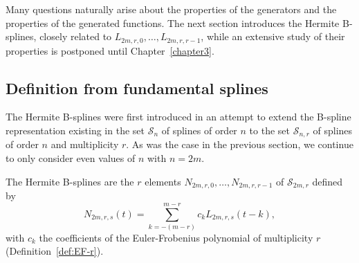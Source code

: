 Many questions naturally arise about the properties of the generators and the properties of the generated functions. The 
next section introduces the Hermite B-splines, closely related to $L_{2m,r,0}, \ldots, L_{2m, r, r-1}$, while an 
extensive study of their properties is postponed until Chapter~\ref{chapter3}.

\subsection{Definition from fundamental splines}

The Hermite B-splines were first introduced in an attempt to extend the B-spline representation existing in the set 
$\mathscr{S}_n$ of splines of order $n$ to the set $\mathscr{S}_{n,r}$ of splines of order $n$ and multiplicity $r$.   
As was the case in the previous section, we continue to only consider even values of $n$ with $n=2m$.

\begin{deftn}\label{def:hbsplines}
  The Hermite B-splines are the $r$ elements $N_{2m,r,0}, \ldots, N_{2m,r,r-1}$ of $\mathscr{S}_{2m,r}$ defined by 
  \begin{equation}\label{eq:def-hbsplines}
    N_{2m,r,s}(t) = \sum_{k=-(m-r)}^{m-r} c_k L_{2m,r,s}(t-k),
  \end{equation}
  with $c_k$ the coefficients of the Euler-Frobenius polynomial of multiplicity $r$ (Definition~\ref{def:EF-r}).
\end{deftn}


